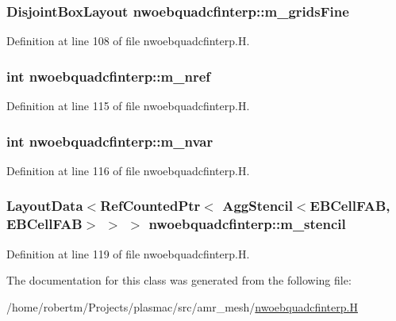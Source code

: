 \subsubsection[{\texorpdfstring{m\+\_\+grids\+Fine}{m_gridsFine}}]{\setlength{\rightskip}{0pt plus 5cm}Disjoint\+Box\+Layout nwoebquadcfinterp\+::m\+\_\+grids\+Fine\hspace{0.3cm}{\ttfamily [protected]}}\hypertarget{classnwoebquadcfinterp_ac3ef73d072197f116ce498bec5d28637}{}\label{classnwoebquadcfinterp_ac3ef73d072197f116ce498bec5d28637}


Definition at line 108 of file nwoebquadcfinterp.\+H.

\subsubsection[{\texorpdfstring{m\+\_\+nref}{m_nref}}]{\setlength{\rightskip}{0pt plus 5cm}int nwoebquadcfinterp\+::m\+\_\+nref\hspace{0.3cm}{\ttfamily [protected]}}\hypertarget{classnwoebquadcfinterp_a2814bffc586d7cb9913d241379896025}{}\label{classnwoebquadcfinterp_a2814bffc586d7cb9913d241379896025}


Definition at line 115 of file nwoebquadcfinterp.\+H.

\subsubsection[{\texorpdfstring{m\+\_\+nvar}{m_nvar}}]{\setlength{\rightskip}{0pt plus 5cm}int nwoebquadcfinterp\+::m\+\_\+nvar\hspace{0.3cm}{\ttfamily [protected]}}\hypertarget{classnwoebquadcfinterp_a36ee80e85ed928375f0ba2162ffe8511}{}\label{classnwoebquadcfinterp_a36ee80e85ed928375f0ba2162ffe8511}


Definition at line 116 of file nwoebquadcfinterp.\+H.

\subsubsection[{\texorpdfstring{m\+\_\+stencil}{m_stencil}}]{\setlength{\rightskip}{0pt plus 5cm}Layout\+Data$<$Ref\+Counted\+Ptr$<$ Agg\+Stencil$<$E\+B\+Cell\+F\+AB, E\+B\+Cell\+F\+AB$>$ $>$ $>$ nwoebquadcfinterp\+::m\+\_\+stencil\hspace{0.3cm}{\ttfamily [protected]}}\hypertarget{classnwoebquadcfinterp_a5b74c7be12aa17afebf582bb78ffadbc}{}\label{classnwoebquadcfinterp_a5b74c7be12aa17afebf582bb78ffadbc}


Definition at line 119 of file nwoebquadcfinterp.\+H.



The documentation for this class was generated from the following file\+:\begin{DoxyCompactItemize}
\item 
/home/robertm/\+Projects/plasmac/src/amr\+\_\+mesh/\hyperlink{nwoebquadcfinterp_8H}{nwoebquadcfinterp.\+H}\end{DoxyCompactItemize}
